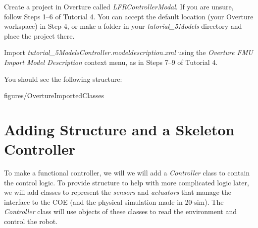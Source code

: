\documentclass[11pt,a4paper]{../tutorial}
\begin{document}
\begin{instructions}
\item Create a project in Overture called \emph{LFRControllerModal}. If you are unsure, follow Steps 1--6 of Tutorial 4. You can accept the default location (your Overture workspace) in Step 4, or make a folder in your \emph{tutorial\_5\pathsep{}Models} directory and place the project there.

\item Import \emph{tutorial\_5\pathsep{}Models\pathsep{}Controller.modeldescription.xml} using the \emph{Overture FMU \menusep Import Model Description} context menu, as in Steps 7--9 of Tutorial 4.

    You should see the following structure:

    \begin{annotation}[width=0.25\linewidth,trim=0 300 535 0,clip]{figures/OvertureImportedClasses}
    \end{annotation}

\end{instructions}

\section{Adding Structure and a Skeleton Controller}

To make a functional controller, we will we will add a \emph{Controller} class to contain the control logic. To provide structure to help with more complicated logic later, we will add classes to represent the \emph{sensors} and \emph{actuators} that manage the interface to the COE (and the physical simulation made in 20-sim). The \emph{Controller} class will use objects of these classes to read the environment and control the robot.
\end{document}
